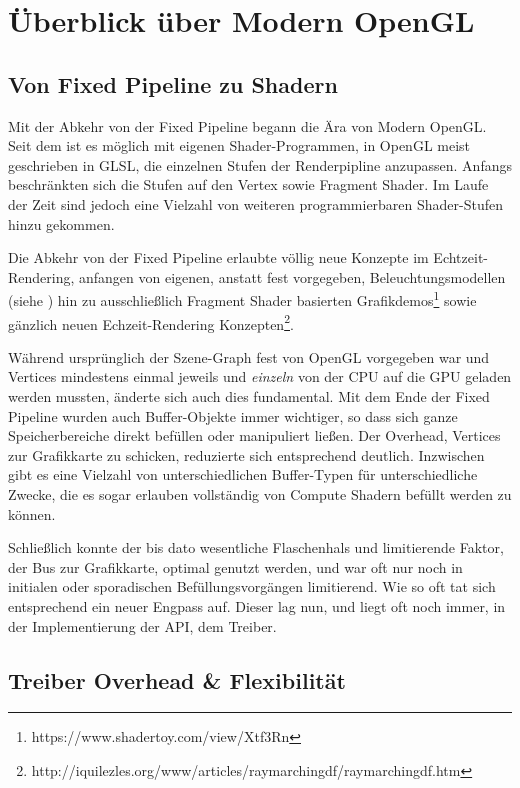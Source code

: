 \chapter{Überblick über Modern OpenGL}
\label{chap:modern-opengl}

\section{Von Fixed Pipeline zu Shadern}
Mit der Abkehr von der Fixed Pipeline begann die Ära von Modern OpenGL. Seit dem ist es möglich mit eigenen Shader-Programmen, in OpenGL meist geschrieben in GLSL, die einzelnen Stufen der Renderpipline anzupassen. Anfangs beschränkten sich die Stufen auf den Vertex sowie Fragment Shader. Im Laufe der Zeit sind jedoch eine Vielzahl von weiteren programmierbaren Shader-Stufen hinzu gekommen.

Die Abkehr von der Fixed Pipeline erlaubte völlig neue Konzepte im Echtzeit-Rendering, anfangen von eigenen, anstatt fest vorgegeben, Beleuchtungsmodellen (siehe ) hin zu ausschließlich Fragment Shader basierten Grafikdemos\footnote{https://www.shadertoy.com/view/Xtf3Rn} sowie gänzlich neuen Echzeit-Rendering Konzepten\footnote{http://iquilezles.org/www/articles/raymarchingdf/raymarchingdf.htm}.

Während ursprünglich der Szene-Graph fest von OpenGL vorgegeben war und Vertices mindestens einmal jeweils und \textit{einzeln} von der CPU auf die GPU geladen werden mussten, änderte sich auch dies fundamental. Mit dem Ende der Fixed Pipeline wurden auch Buffer-Objekte immer wichtiger, so dass sich ganze Speicherbereiche direkt befüllen oder manipuliert ließen. Der Overhead, Vertices zur Grafikkarte zu schicken, reduzierte sich entsprechend deutlich. Inzwischen gibt es eine Vielzahl von unterschiedlichen Buffer-Typen für unterschiedliche Zwecke, die es sogar erlauben vollständig von Compute Shadern befüllt werden zu können.

Schließlich konnte der bis dato wesentliche Flaschenhals und limitierende Faktor, der Bus zur Grafikkarte, optimal genutzt werden, und war oft nur noch in initialen oder sporadischen Befüllungsvorgängen limitierend. Wie so oft tat sich entsprechend ein neuer Engpass auf. Dieser lag nun, und liegt oft noch immer, in der Implementierung der API, dem Treiber.

\section{Treiber Overhead \& Flexibilität}
\label{sec:overhead-und-flexibilitaet}


